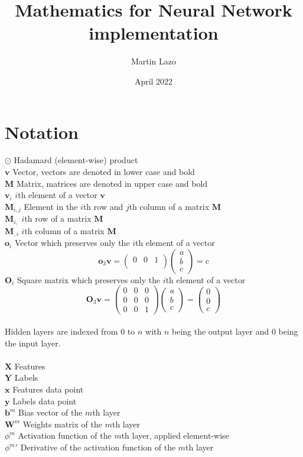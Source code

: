 \documentclass{article}
\title{Mathematics for Neural Network implementation}
\author{Martin Lazo}
\date{April 2022}
\begin{document}
\maketitle
\section{Notation}
\noindent
$\odot$ \tab Hadamard (element-wise) product\\
$\textbf{v}$ \tab Vector, vectors are denoted in lower case and bold\\
$\textbf{M}$ \tab Matrix, matrices are denoted in upper case and bold\\
$\textbf{v}_i$ \tab $i$th element of a vector $\textbf{v}$\\
$\textbf{M}_{i,j}$ \tab Element in the $i$th row and $j$th column of a matrix $\textbf{M}$\\
$\textbf{M}_{i,}$ \tab $i$th row of a matrix $\textbf{M}$\\
$\textbf{M}_{,i}$ \tab $i$th column of a matrix $\textbf{M}$\\
$\textbf{o}_i$ \tab Vector which preserves only the $i$th element of a vector\\
$$
\textbf{o}_3\textbf{v}=
\begin{pmatrix}
0 & 0 & 1\\
\end{pmatrix}
\begin{pmatrix}
a\\
b\\
c
\end{pmatrix}
=
c
$$
$\textbf{O}_i$ \tab Square matrix which preserves only the $i$th element of a vector\\
$$
\textbf{O}_3\textbf{v}=
\begin{pmatrix}
0 & 0 & 0\\
0 & 0 & 0\\
0 & 0 & 1
\end{pmatrix}
\begin{pmatrix}
a\\
b\\
c
\end{pmatrix}
=
\begin{pmatrix}
0\\
0\\
c
\end{pmatrix}
$$
\\
Hidden layers are indexed from $0$ to $n$ with $n$ being the output layer and $0$ being the input layer.\\
\\
$\textbf{X}$ \tab Features\\
$\textbf{Y}$ \tab Labels\\
$\textbf{x}$ \tab Features data point\\
$\textbf{y}$ \tab Labels data point\\
$\textbf{b}^m$ \tab Bias vector of the $m$th layer\\
$\textbf{W}^m$ \tab Weights matrix of the $m$th layer\\
$\phi^m$ \tab Activation function of the $m$th layer, applied element-wise\\
${\phi^m}'$ \tab Derivative of the activation function of the $m$th layer\\
\pagebreak
\end{document}
